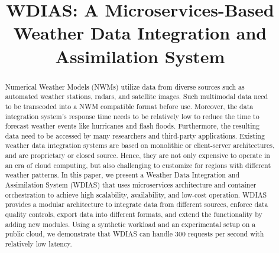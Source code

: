 \documentclass[conference]{IEEEtran}
\begin{document}
\title{WDIAS: A Microservices-Based Weather Data Integration and Assimilation System\\
}

\author{
\and
{}
\and
{}
}

\maketitle

\begin{abstract}
Numerical Weather Models (NWMs) utilize data from diverse sources such as automated weather stations, radars, and satellite images. Such multimodal data need to be transcoded into a NWM compatible format before use. Moreover, the data integration system's response time needs to be relatively low to reduce the time to forecast weather events like hurricanes and flash floods. Furthermore, the resulting data need to be accessed by many researchers and third-party applications. Existing weather data integration systems are based on monolithic or client-server architectures, and are proprietary or closed source. Hence, they are not only expensive to operate in an era of cloud computing, but also challenging to customize for regions with different weather patterns. In this paper, we present a Weather Data Integration and Assimilation System (WDIAS) that uses microservices architecture and container orchestration to achieve high scalability, availability, and low-cost operation. WDIAS provides a modular architecture to integrate data from different sources, enforce data quality controls, export data into different formats, and extend the functionality by adding new modules. Using a synthetic workload and an experimental setup on a public cloud, we demonstrate that WDIAS can handle 300 requests per second with relatively low latency.
\end{abstract}
\end{document}
